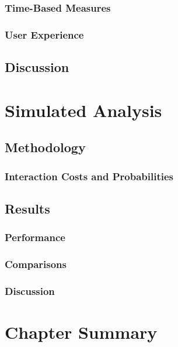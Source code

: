 \subsubsection{Time-Based Measures}

\subsubsection{User Experience}

\subsection{Discussion}

\section{Simulated Analysis}\label{chap:snippets:simulations}

\subsection{Methodology}

\subsubsection{Interaction Costs and Probabilities}

\subsection{Results}

\subsubsection{Performance}

\subsubsection{Comparisons}

\subsubsection{Discussion}

\section{Chapter Summary}